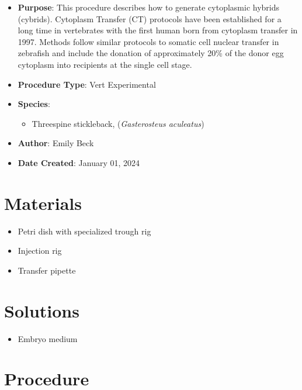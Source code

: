 \documentclass[
  letterpaper,
  DIV=11,
  numbers=noendperiod]{scrreprt}
\providecommand{\tightlist}{%
  \setlength{\itemsep}{0pt}\setlength{\parskip}{0pt}}\usepackage{longtable,booktabs,array}
\begin{document}
\begin{itemize}
\tightlist
\item
  \textbf{Purpose}: This procedure describes how to generate cytoplasmic
  hybrids (cybrids). Cytoplasm Transfer (CT) protocols have been
  established for a long time in vertebrates with the first human born
  from cytoplasm transfer in 1997. Methods follow similar protocols to
  somatic cell nuclear transfer in zebrafish and include the donation of
  approximately 20\% of the donor egg cytoplasm into recipients at the
  single cell stage.
\item
  \textbf{Procedure Type}: Vert Experimental
\item
  \textbf{Species}:

  \begin{itemize}
  \tightlist
  \item
    Threespine stickleback, (\emph{Gasterosteus aculeatus})
  \end{itemize}
\item
  \textbf{Author}: Emily Beck
\item
  \textbf{Date Created}: January 01, 2024
\end{itemize}

\hypertarget{materials-46}{%
\section{Materials}\label{materials-46}}

\begin{itemize}
\tightlist
\item
  Petri dish with specialized trough rig
\item
  Injection rig
\item
  Transfer pipette
\end{itemize}

\hypertarget{solutions-43}{%
\section{Solutions}\label{solutions-43}}

\begin{itemize}
\tightlist
\item
  Embryo medium
\end{itemize}

\hypertarget{procedure-46}{%
\section{Procedure}\label{procedure-46}}
\end{document}

